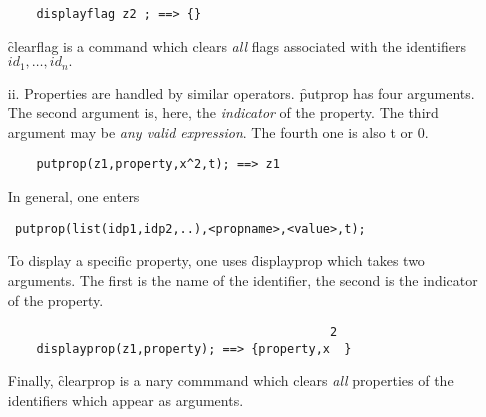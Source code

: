 \begin{itemize}
\begin{verbatim}
    displayflag z2 ; ==> {}
\end{verbatim}
\f{clearflag} is a command which clears \emph{all} flags associated with
the identifiers $id_1, \ldots , id_n .$
\item[ii.] Properties are handled by similar operators.
\hypertarget{operator:PUTPROP}{}
\f{putprop} has four arguments. The second argument is, here, the
\emph{indicator} of the property. The third argument may be \emph{any
valid expression}. The fourth one is also t or 0.
\begin{verbatim}
    putprop(z1,property,x^2,t); ==> z1
\end{verbatim}
In general, one enters
\begin{verbatim}
 putprop(list(idp1,idp2,..),<propname>,<value>,t);
\end{verbatim}
\hypertarget{operator:DISPLAYPROP}{}
To display a specific property, one uses
\f{displayprop} which takes two arguments. The first is the name of the
identifier, the second is the indicator of the property.
\begin{verbatim}
                                             2
    displayprop(z1,property); ==> {property,x  }
\end{verbatim}
\hypertarget{operator:CLEARPROP}{}
Finally, \f{clearprop} is a nary commmand which clears \emph{all}
properties of the identifiers which appear as arguments.
\end{itemize}
